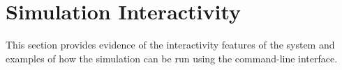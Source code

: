\documentclass[12pt,a4paper,twoside,openright]{report}
\begin{document}
\appendix

\chapter{Simulation Interactivity}\label{chapter:simulation-interactivity}

This section provides evidence of the interactivity features of the system and examples of how the simulation can be run using the command-line interface.
\end{document}

